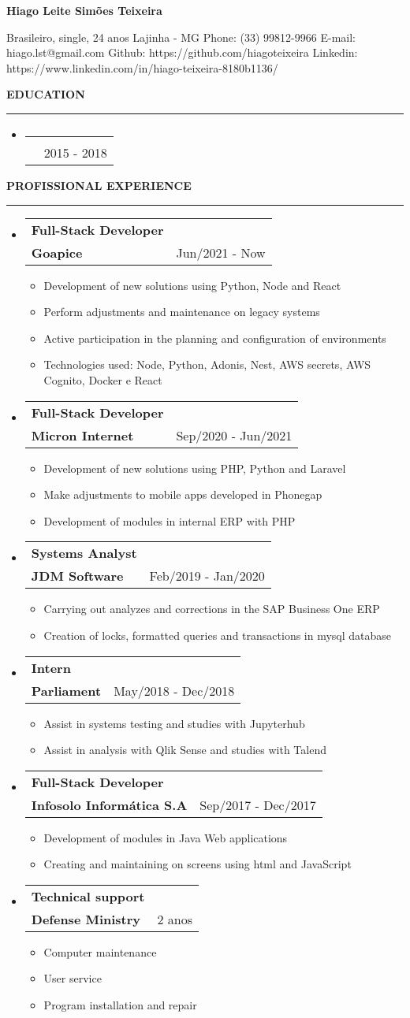 \documentclass[a4paper,10pt]{article}
\makeatletter
\newcommand{\EducationItem}[3]{
    \item
    \begin{tabular*}{0.93\textwidth}[t]{l@{\extracolsep{\fill}}r}
        \normalfont{#1} & \\
        \small\normalfont{#2} & \scriptsize#3
    \end{tabular*}
}
\newcommand{\WorkExpItem}[3]{
    \item
        \begin{tabular*}{0.93\textwidth}[t]{l@{\extracolsep{\fill}}r}
            \textbf{#1} & \\
            \small\textbf{#2} & \scriptsize#3 \\
        \end{tabular*}
}
\newcommand{\WorkExpActivitiesBegin}[0]{
    \vspace{-5pt}\begin{itemize}
}
\newcommand{\WorkExpActivitiesItem}[1]{
    \vspace{-2pt}\item[]\small #1
}
\newcommand{\WorkExpActivitiesEnd}[0]{
    \end{itemize}\vspace{-7pt}
}
\newcommand{\SectionTitle}[1]{
    \begin{flushleft}
    \textbf{#1}
    \noindent\textcolor{gray}{\rule{18.5cm}{1px}}
    \end{flushleft}
}
\newcommand{\SectionBegin}[0]{
    \vspace{-16pt}\begin{flushleft}
    \begin{itemize}
}
\newcommand{\SectionEnd}[0]{
    \end{itemize}
    \end{flushleft}\vspace{-2pt}
}
\newcommand{\PersonInformation}[7]{
    \begin{flushleft}
        \begin{LARGE}
            \textbf{#1}
        \end{LARGE}
    \end{flushleft}

    \begin{flushleft}
        #2
        \newline
        #3
        \newline
        Phone: #4
        \newline
        E-mail: #5
        \newline
        Github: #6
        \newline
        Linkedin: #7
        \newline
    \end{flushleft}
}
\makeatother
\begin{document}

\PersonInformation
    {Hiago Leite Simões Teixeira}
    {Brasileiro, single, 24 anos}
    {Lajinha - MG}
    {(33) 99812-9966}
    {hiago.lst@gmail.com}
    {https://github.com/hiagoteixeira}
    {https://www.linkedin.com/in/hiago-teixeira-8180b1136/}

\SectionTitle
    {EDUCATION}
\SectionBegin
    \EducationItem
        {Bachelor on Computer science}
        {Centro Universitário de Brasília - UniCEUB}
        {2015 - 2018}
\SectionEnd

\SectionTitle
    { PROFISSIONAL EXPERIENCE}
\SectionBegin
    \WorkExpItem
        {Full-Stack Developer}
        {Goapice}
        {Jun/2021 - Now}
        \WorkExpActivitiesBegin
            \WorkExpActivitiesItem{Development of new solutions using Python, Node and React}
            \WorkExpActivitiesItem{Perform adjustments and maintenance on legacy systems}
            \WorkExpActivitiesItem{Active participation in the planning and configuration of environments}
            \WorkExpActivitiesItem{Technologies used: Node, Python, Adonis, Nest, AWS secrets, AWS Cognito, Docker e React}
        \WorkExpActivitiesEnd

    \WorkExpItem
        {Full-Stack Developer}
        {Micron Internet}
        {Sep/2020 - Jun/2021}
        \WorkExpActivitiesBegin
            \WorkExpActivitiesItem{Development of new solutions using PHP, Python and Laravel}
            \WorkExpActivitiesItem{Make adjustments to mobile apps developed in Phonegap}
            \WorkExpActivitiesItem{Development of modules in internal ERP with PHP}
        \WorkExpActivitiesEnd
    \WorkExpItem
        {Systems Analyst}
        {JDM Software}
        {Feb/2019 - Jan/2020}
        \WorkExpActivitiesBegin
            \WorkExpActivitiesItem{Carrying out analyzes and corrections in the SAP Business One ERP}
            \WorkExpActivitiesItem{Creation of locks, formatted queries and transactions in mysql database}
        \WorkExpActivitiesEnd
    \WorkExpItem
        {Intern}
        {Parliament}
        {May/2018 - Dec/2018}
        \WorkExpActivitiesBegin
            \WorkExpActivitiesItem{Assist in systems testing and studies with Jupyterhub}
            \WorkExpActivitiesItem{Assist in analysis with Qlik Sense and studies with Talend}
        \WorkExpActivitiesEnd
    \WorkExpItem
        {Full-Stack Developer}
        {Infosolo Informática S.A}
        {Sep/2017 - Dec/2017}
        \WorkExpActivitiesBegin
            \WorkExpActivitiesItem{Development of modules in Java Web applications}
            \WorkExpActivitiesItem{Creating and maintaining on screens using html and JavaScript}
        \WorkExpActivitiesEnd
    \WorkExpItem
        {Technical support}
        {Defense Ministry}
        {2 anos}
        \WorkExpActivitiesBegin
            \WorkExpActivitiesItem{Computer maintenance}
            \WorkExpActivitiesItem{User service}
            \WorkExpActivitiesItem{Program installation and repair}
        \WorkExpActivitiesEnd
\SectionEnd
\end{document}
